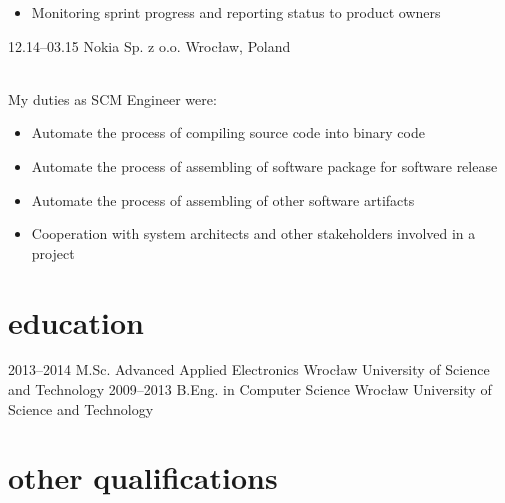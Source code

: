 \documentclass[]{cv-style}          %
\begin{document}
\begin{entrylist}
{\begin{itemize}
    \item Monitoring sprint progress and reporting status to product owners
  \end{itemize}}
\entry
  {12.14--03.15}
  {Nokia Sp. z o.o.}
  {Wrocław, Poland}
  {\\
  My duties as SCM Engineer were:
  \begin{itemize}
    \item Automate the process of compiling source code into binary code
    \item Automate the process of assembling of software package for software release
    \item Automate the process of assembling of other software artifacts
    \item Cooperation with system architects and other stakeholders involved in a project
  \end{itemize}}

\end{entrylist}


\section{education}

\begin{entrylist}
\entry
{2013--2014}
{M.Sc. {\normalfont Advanced Applied Electronics}}
{Wrocław University of Science and Technology}
{\vspace{-0.3cm}}
\entry
{2009--2013}
{B.Eng. {\normalfont in Computer Science}}
{Wrocław University of Science and Technology}
{\vspace{-0.3cm}}
\end{entrylist}


\section{other qualifications}
\end{document}
